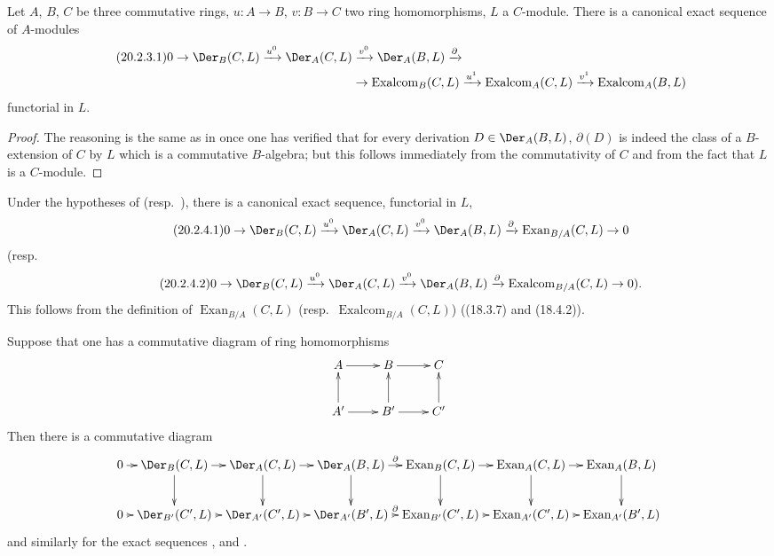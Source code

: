 \begin{corollary}[20.2.3]
\label{0.20.2.3}
Let $A$, $B$, $C$ be three commutative rings, $u:A\to B$, $v:B\to C$ two ring homomorphisms, $L$ a $C$-module.
There is a canonical exact sequence of $A$-modules
\begin{align}
\tag{20.2.3.1}
  \label{0.20.2.3.1}
  0\to\Der_B(C,L)\xrightarrow{u^0}\Der_A(C,L)&\xrightarrow{v^0}\Der_A(B,L)\xrightarrow{\partial} \\
  &\to\operatorname{Exalcom}_B(C,L)\xrightarrow{u^1}\operatorname{Exalcom}_A(C,L)\xrightarrow{v^1}\operatorname{Exalcom}_A(B,L) \notag
\end{align}
functorial in $L$.
\end{corollary}

\begin{proof}
The reasoning is the same as in  once one has verified that for every derivation $D\in\Der_A(B,L)$, $\partial(D)$ is indeed the class of a $B$-extension of $C$ by $L$ which is a commutative $B$-algebra; but this follows immediately from the commutativity of $C$ and from the fact that $L$ is a $C$-module.
\end{proof}

\begin{corollary}[20.2.4]
\label{0.20.2.4}
Under the hypotheses of  \textup{(}resp.\ \textup{)}, there is a canonical exact sequence, functorial in $L$,
\begin{equation}
\tag{20.2.4.1}
  \label{0.20.2.4.1}
  0\to\Der_B(C,L)\xrightarrow{u^0}\Der_A(C,L)\xrightarrow{v^0}\Der_A(B,L)\xrightarrow{\partial}\operatorname{Exan}_{B/A}(C,L)\to 0
\end{equation}
\textup{(}resp.
\begin{equation}
\tag{20.2.4.2}
  \label{0.20.2.4.2}
  0\to\Der_B(C,L)\xrightarrow{u^0}\Der_A(C,L)\xrightarrow{v^0}\Der_A(B,L)\xrightarrow{\partial}\operatorname{Exalcom}_{B/A}(C,L)\to 0\text{).}
\end{equation}
This follows from the definition of $\operatorname{Exan}_{B/A}(C,L)$ \textup{(}resp.\ $\operatorname{Exalcom}_{B/A}(C,L)$\textup{)} \textup{(}(18.3.7) and (18.4.2)\textup{)}.
\end{corollary}

\begin{remark}[20.2.5]
\label{0.20.2.5}
Suppose that one has a commutative diagram of ring homomorphisms
\[
\xymatrix{
  A \ar[r] & B \ar[r] & C \\
  A' \ar[u] \ar[r] & B' \ar[u] \ar[r] & C' \ar[u]
}
\]
Then there is a commutative diagram
\[
\xymatrix@C=0.5em{
  0 \ar[r] & \Der_B(C,L) \ar[r] \ar[d] & \Der_A(C,L) \ar[r] \ar[d] & \Der_A(B,L) \ar[r]^-\partial \ar[d] & \operatorname{Exan}_B(C,L) \ar[r] \ar[d] & \operatorname{Exan}_A(C,L) \ar[r] \ar[d] & \operatorname{Exan}_A(B,L) \ar[d] \\
  0 \ar[r] & \Der_{B'}(C',L) \ar[r] & \Der_{A'}(C',L) \ar[r] & \Der_{A'}(B',L) \ar[r]^-\partial & \operatorname{Exan}_{B'}(C',L) \ar[r] & \operatorname{Exan}_{A'}(C',L) \ar[r] & \operatorname{Exan}_{A'}(B',L)
}
\]
and similarly for the exact sequences ,  and .
\end{remark}

